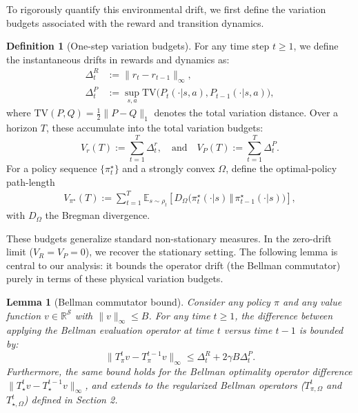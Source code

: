 \documentclass{article}
\theoremstyle{plain}
\newtheorem{lemma}[theorem]{Lemma}
\theoremstyle{definition}
\newtheorem{definition}[theorem]{Definition}
\theoremstyle{remark}
\newcommand{\E}{\mathbb{E}}
\newcommand{\1}{\mathbbm{1}}
\begin{document}
To rigorously quantify this environmental drift, we first define the variation budgets associated with the reward and transition dynamics.

\begin{definition}[One-step variation budgets]
\label{def:variation_budgets}
For any time step $t \ge 1$, we define the instantaneous drifts in rewards and dynamics as:
\begin{align}
    \Delta_t^R &:= \|r_t - r_{t-1}\|_\infty, \label{eq:delta_R} \\
    \Delta_t^P &:= \sup_{s,a} \mathrm{TV}\big(P_t(\cdot|s, a), P_{t-1}(\cdot|s, a)\big), \label{eq:delta_P}
\end{align}
where $\mathrm{TV}(P, Q) = \frac{1}{2}\|P-Q\|_1$ denotes the total variation distance. Over a horizon $T$, these accumulate into the total variation budgets:
\begin{equation}
    V_r(T) := \sum_{t=1}^T \Delta_t^r, \quad \text{and} \quad V_P(T) := \sum_{t=1}^T \Delta_t^P.
\end{equation}
For a policy sequence $\{\pi_t^\star\}$ and a strongly convex $\Omega$, define the optimal-policy path-length
\begin{align}
V_{\pi^\star}(T):=\sum_{t=1}^{T}\E_{s\sim \rho_t}\!\left[D_\Omega\!\big(\pi_t^\star(\cdot|s)\,\Vert\,\pi_{t-1}^\star(\cdot|s)\big)\right],
\end{align}
with $D_\Omega$ the Bregman divergence.
\end{definition}

These budgets generalize standard non-stationary measures. In the zero-drift limit ($V_R = V_P = 0$), we recover the stationary setting. The following lemma is central to our analysis: it bounds the operator drift (the Bellman commutator) purely in terms of these physical variation budgets.

\begin{lemma}[Bellman commutator bound]
\label{lemma:commutator}
Consider any policy $\pi$ and any value function $v \in \mathbb{R}^\mathcal{S}$ with $\|v\|_\infty \le B$. For any time $t \ge 1$, the difference between applying the Bellman evaluation operator at time $t$ versus time $t-1$ is bounded by:
\begin{equation}
    \|T^t_\pi v - T^{t-1}_\pi v\|_\infty \le \Delta_t^R + 2\gamma B \Delta_t^P. \tag{$\star$}
\end{equation}
Furthermore, the same bound holds for the Bellman optimality operator difference $\|T^t_\star v - T^{t-1}_\star v\|_\infty$, and extends to the regularized Bellman operators ($T^t_{\pi, \Omega}$ and $T^t_{\star, \Omega}$) defined in Section 2.
\end{lemma}
\end{document}
